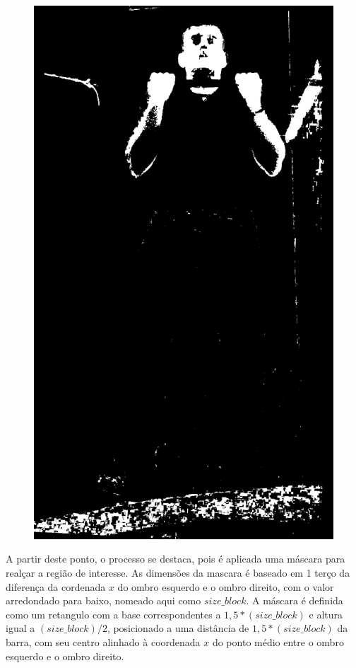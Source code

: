 \begin{figure}[H]
\begin{minipage}{\sizeImg\textwidth}
            \includegraphics[width=\textwidth]{figuras/ultrapassar_barra/134_limited.png}
        \end{minipage}
    \label{fig:bin_ultrapassar_barra}
\end{figure}
\renewcommand{\sizeImg}{0.4}


 A partir deste ponto, o processo se destaca, pois é aplicada uma máscara para realçar a região de interesse. As dimensões da mascara é baseado em 1 terço da diferença da cordenada $x$ do ombro esquerdo e o ombro direito, com o valor arredondado para baixo, nomeado aqui como $size\_block$. A máscara é definida como um retangulo com a base correspondentes a  $1,5*(size\_block)$ e altura igual a  $(size\_block)/2$, posicionado a uma distância de  $1,5*(size\_block)$ da barra, com seu centro alinhado à coordenada $x$ do ponto médio entre o ombro esquerdo e o ombro direito.
 
